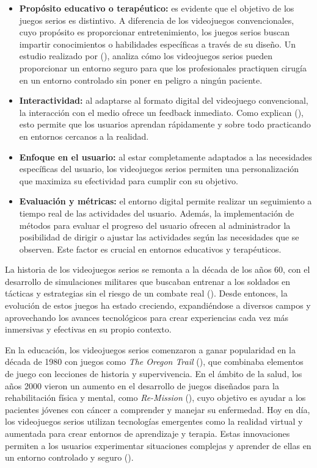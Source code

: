 \begin{itemize}
	\item \textbf{Propósito educativo o terapéutico:} es evidente que el objetivo de los juegos serios es distintivo. A diferencia de los videojuegos convencionales, cuyo propósito es proporcionar entretenimiento, los juegos serios buscan impartir conocimientos o habilidades específicas a través de su diseño. Un estudio realizado por \citeauthor{GRAAFLAND:2012} (\citeyear{GRAAFLAND:2012}), analiza cómo los videojuegos serios pueden proporcionar un entorno seguro para que los profesionales practiquen cirugía en un entorno controlado sin poner en peligro a ningún paciente.
	\item \textbf{Interactividad:} al adaptarse al formato digital del videojuego convencional, la interacción con el medio ofrece un feedback inmediato. Como explican \citeauthor{CONNOLLY:2012} (\citeyear{CONNOLLY:2012}), esto permite que los usuarios aprendan rápidamente y sobre todo practicando en entornos cercanos a la realidad.
	\item \textbf{Enfoque en el usuario:} al estar completamente adaptados a las necesidades específicas del usuario, los videojuegos serios permiten una personalización que maximiza su efectividad para cumplir con su objetivo.
	\item \textbf{Evaluación y métricas:} el entorno digital permite realizar un seguimiento a tiempo real de las actividades del usuario. Además, la implementación de métodos para evaluar el progreso del usuario ofrecen al administrador la posibilidad de dirigir o ajustar las actividades según las necesidades que se observen. Este factor es crucial en entornos educativos y terapéuticos.
\end{itemize}

La historia de los videojuegos serios se remonta a la década de los años 60, con el desarrollo de simulaciones militares que buscaban entrenar a los soldados en tácticas y estrategias sin el riesgo de un combate real (\cite{SAWYER:2002}). Desde entonces, la evolución de estos juegos ha estado creciendo, expandiéndose a diversos campos y aprovechando los avances tecnológicos para crear experiencias cada vez más inmersivas y efectivas en su propio contexto. 

En la educación, los videojuegos serios comenzaron a ganar popularidad en la década de 1980 con juegos como \textit{The Oregon Trail} (\cite{OREGONTRAIL:1971}), que combinaba elementos de juego con lecciones de historia y supervivencia. En el ámbito de la salud, los años 2000 vieron un aumento en el desarrollo de juegos diseñados para la rehabilitación física y mental, como \textit{Re-Mission} (\cite{REMISSION:2006}), cuyo objetivo es ayudar a los pacientes jóvenes con cáncer a comprender y manejar su enfermedad. Hoy en día, los videojuegos serios utilizan tecnologías emergentes como la realidad virtual y aumentada para crear entornos de aprendizaje y terapia. Estas innovaciones permiten a los usuarios experimentar situaciones complejas y aprender de ellas en un entorno controlado y seguro (\cite{FREITAS:2011}).

